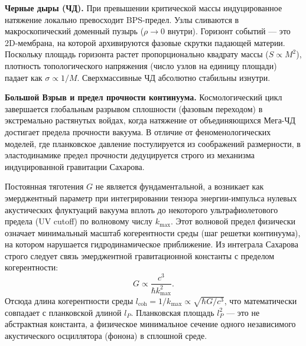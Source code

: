\documentclass[11pt,a4paper]{article}
\begin{document}
	\textbf{Черные дыры (ЧД).} При превышении критической массы индуцированное натяжение локально превосходит BPS-предел. Узлы сливаются в макроскопический доменный пузырь ($\rho \to 0$ внутри). Горизонт событий — это 2D-мембрана, на которой архивируются фазовые скрутки падающей материи. Поскольку площадь горизонта растет пропорционально квадрату массы ($S \propto M^2$), плотность топологического напряжения (число узлов на единицу площади) падает как $\sigma \propto 1/M$. Сверхмассивные ЧД абсолютно стабильны изнутри.
	
	\textbf{Большой Взрыв и предел прочности континуума.} 
	Космологический цикл завершается глобальным разрывом сплошности (фазовым переходом) в экстремально растянутых войдах, когда натяжение от объединяющихся Мега-ЧД достигает предела прочности вакуума. В отличие от феноменологических моделей, где планковское давление постулируется из соображений размерности, в эластодинамике предел прочности дедуцируется строго из механизма индуцированной гравитации Сахарова.
	
	Постоянная тяготения $G$ не является фундаментальной, а возникает как эмерджентный параметр при интегрировании тензора энергии-импульса нулевых акустических флуктуаций вакуума вплоть до некоторого ультрафиолетового предела (UV cutoff) по волновому числу $k_{\text{max}}$. Этот волновой предел физически означает минимальный масштаб когерентности среды (шаг решетки континуума), на котором нарушается гидродинамическое приближение. 
	Из интеграла Сахарова строго следует связь эмерджентной гравитационной константы с пределом когерентности:
	\begin{equation}
		G \propto \frac{c^3}{\hbar k_{\text{max}}^2}.
	\end{equation}
	Отсюда длина когерентности среды $l_{\text{coh}} = 1/k_{\text{max}} \propto \sqrt{\hbar G / c^3}$, что математически совпадает с планковской длиной $l_P$. Планковская площадь $l_P^2$ — это не абстрактная константа, а физическое минимальное сечение одного независимого акустического осциллятора (фонона) в сплошной среде.
	
\end{document}
